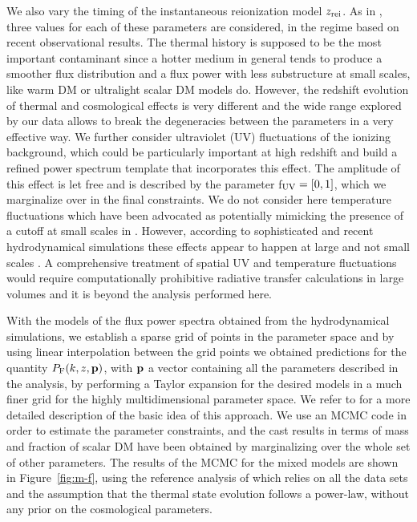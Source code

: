 \documentclass[11pt,nofootinbib]{article}
\numberwithin{equation}{section}
\begin{document}
We also vary the timing of the instantaneous reionization
model $z_{\rm rei}$. As in \cite{Irsic:2017yje}, three values for
each of these parameters are considered, in the regime based on recent
observational results. The thermal history is supposed to be the most important contaminant
since a hotter medium in general tends to produce a smoother flux
distribution and a flux power with less substructure at small scales,
like warm DM or ultralight scalar DM models
do. However, the redshift evolution of thermal and cosmological effects is very different and the wide range
explored by our data allows to break the degeneracies between the parameters in a very effective way.
We further consider ultraviolet (UV) fluctuations of the ionizing background, which could be particularly important at high redshift and 
build a refined power spectrum template that  incorporates this effect. The amplitude of this effect is let free and is described by the parameter
f$_{\rm UV}=[0,1]$, which we marginalize over in the final constraints.
We do not consider here temperature fluctuations which have been advocated as potentially mimicking the 
presence of a cutoff at small scales in \cite{Hui:2016ltb}. However, according to sophisticated and recent hydrodynamical simulations
these effects appear to happen at large and not small scales \cite{cen09,aloisio15}.
A comprehensive treatment of spatial UV and temperature fluctuations would require computationally prohibitive
radiative transfer calculations in large volumes and it is beyond the analysis performed here.

With the models of the flux power spectra obtained from the hydrodynamical
simulations, we establish a sparse grid of points in the parameter
space and by using linear interpolation between the grid points we obtained
predictions for the quantity $P_{\rm F}(k,z,{\bf{p}})$, with ${\bf{p}}$ a vector containing all the parameters described in the analysis, by performing a Taylor expansion for the desired models in a much finer grid for the highly multidimensional parameter space.   We refer to \cite{v06} for a more detailed description of the basic idea of this approach.
We use an MCMC code in order to estimate the parameter constraints, and the cast results in terms
of mass and fraction of scalar DM have been obtained by marginalizing over the whole set of other parameters. The results of the MCMC  for the mixed models are shown in Figure~\ref{fig:m-f}, using the  reference analysis of  \cite{Irsic:2017yje} which relies on all the data sets and the assumption that the thermal state evolution
follows a power-law, without any prior on the cosmological parameters.
\end{document}
